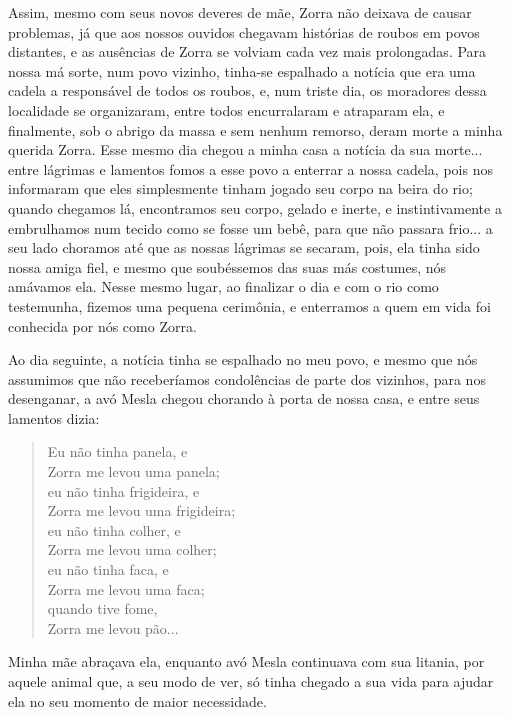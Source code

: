 Assim, mesmo com seus novos deveres de mãe, Zorra não deixava de causar problemas, já que aos nossos ouvidos chegavam histórias de roubos em povos distantes, e as ausências de Zorra se volviam cada vez mais prolongadas.
Para nossa má sorte, num povo vizinho, tinha-se espalhado a notícia que era uma cadela a responsável de todos os roubos, e, num triste dia, os moradores dessa localidade se organizaram, entre todos encurralaram e atraparam ela, e finalmente, sob o abrigo da massa e sem nenhum remorso, deram morte a minha querida Zorra.
Esse mesmo dia chegou a minha casa a notícia da sua morte... entre lágrimas e lamentos fomos a esse povo a enterrar a nossa cadela, pois nos informaram que eles simplesmente tinham jogado seu corpo na beira do rio; quando chegamos lá, encontramos seu corpo, gelado e inerte, e instintivamente a embrulhamos  num tecido como se fosse um bebê, para que não passara frio... a seu lado choramos até que as nossas lágrimas se secaram, pois, ela tinha sido nossa amiga fiel, e mesmo que soubéssemos das suas más costumes, nós amávamos ela.
Nesse mesmo lugar, ao finalizar o dia e com o rio como testemunha, fizemos uma pequena cerimônia, e enterramos a quem em vida foi conhecida por nós como Zorra. 

Ao dia seguinte, a notícia tinha se espalhado no meu povo, e mesmo que nós assumimos que não receberíamos condolências de parte dos vizinhos, para nos desenganar, a avó Mesla chegou chorando à porta de nossa casa, e entre seus lamentos dizia:
\begin{quotation}
\noindent Eu não tinha panela, e \\Zorra me levou uma panela;\\ 
eu não tinha frigideira, e \\Zorra me levou uma frigideira;\\ 
eu não tinha colher, e \\Zorra me levou uma colher;\\
eu não tinha faca, e \\Zorra me levou uma faca;\\
quando tive fome, \\Zorra me levou pão...  
\end{quotation}
Minha mãe abraçava ela, enquanto avó Mesla continuava com sua litania, por aquele animal que, a seu modo de ver, só tinha chegado a sua vida para ajudar ela no seu momento de maior necessidade.
 

